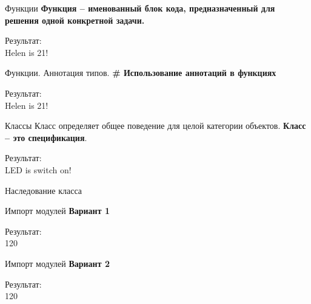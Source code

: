 \documentclass[12pt]{beamer}
\begin{document}
\begin{frame}{Функции}
\textbf{Функция -- именованный блок кода, предназначенный для решения одной конкретной задачи.} \\
\vspace{0.5cm}

\vspace{0.5cm}
Результат: \\
Helen is 21! \\
\end{frame}


\begin{frame}{Функции. Аннотация типов.}
\textbf{\# Использование аннотаций в функциях} \\
\vspace{0.5cm}

\vspace{0.5cm}
Результат: \\
Helen is 21! \\
\end{frame}


\begin{frame}{Классы}
\vspace{0.2cm}
Класс определяет общее поведение для целой категории объектов. \textbf{Класс -- это спецификация}.
\vspace{0.5cm}

\vspace{0.5cm}
Результат: \\
LED is switch on!\\
\end{frame}


\begin{frame}{Наследование класса}

\end{frame}


\begin{frame}{Импорт модулей}
\textbf{Вариант 1}
\vspace{0.5cm}

\vspace{0.5cm}
Результат: \\
120 \\
\end{frame}


\begin{frame}{Импорт модулей}
\textbf{Вариант 2}
\vspace{0.5cm}

\vspace{0.5cm}
Результат: \\
120 \\
\end{frame}
\end{document}
